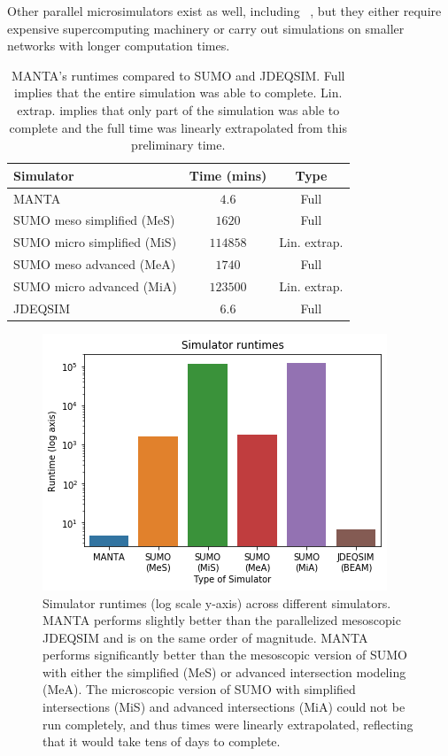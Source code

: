 \documentclass[final]{IEEEtran}
\begin{document}
Other parallel microsimulators exist as well, including ~\cite{chanMobilitiScalableTransportation2018, barceloParallelizationMicroscopicTraffic1998, nagelParallelImplementationTRANSIMS2001}, but they either require expensive supercomputing machinery or carry out simulations on smaller networks with longer computation times.

\begin{table}
    \centering
    \begin{tabular}{l c c}
    \toprule
     \textbf{Simulator} & \textbf{Time (mins)} & \textbf{Type}\\
     \midrule
     MANTA & $4.6$ & Full\\
     SUMO meso simplified (MeS) & $1620$ & Full\\  %
     SUMO micro simplified (MiS) & $114858$ & Lin. extrap.\\ %
     SUMO meso advanced (MeA) & $1740$ & Full\\
     SUMO micro advanced (MiA) & $123500$ & Lin. extrap.\\
     JDEQSIM & $6.6$ & Full\\
     \bottomrule
    \end{tabular}
    \label{tab:runtimes}
    \caption{MANTA's runtimes compared to SUMO and JDEQSIM. Full implies that the entire simulation was able to complete. Lin. extrap. implies that only part of the simulation was able to complete and the full time was linearly extrapolated from this preliminary time.}
\end{table}

\begin{figure}
    \centering
    \includegraphics[width=.45\textwidth]{figs/sim_runtimes_log_y_axis.png}
    \caption{Simulator runtimes (log scale y-axis) across different simulators. MANTA performs slightly better than the parallelized mesoscopic JDEQSIM and is on the same order of magnitude. MANTA performs significantly better than the mesoscopic version of SUMO with either the simplified (MeS) or advanced intersection modeling (MeA). The microscopic version of SUMO with simplified intersections (MiS) and advanced intersections (MiA) could not be run completely, and thus times were linearly extrapolated, reflecting that it would take tens of days to complete.}
    \label{fig:sim_runtime}
\end{figure}
\end{document}
